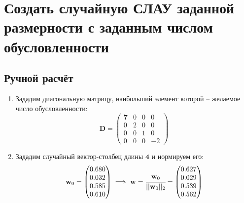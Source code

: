 


\setcounter{page}{2}
\tableofcontents
\listoffigures
\clearpage
\section{Создать случайную СЛАУ заданной размерности с заданным числом обусловленности}
\subsection{Ручной расчёт}
\begin{enumerate}
\item Зададим диагональную матрицу, наибольший элемент которой -- желаемое число обусловленности:
\begin{equation}
    \mathbf{D} =
    \begin{pmatrix}
        \mathbf{7} & 0 & 0 & 0 \\
        0 & 2 & 0 & 0 \\
        0 & 0 & 1 & 0 \\
        0 & 0 & 0 & -2
    \end{pmatrix}
\end{equation}

\item Зададим случайный вектор-столбец длины $\mathbf{4}$ и нормируем его:
\begin{equation}
    \mathbf{w}_0 =
    \begin{pmatrix}
        0.680 \\
        0.032 \\
        0.585 \\
        0.610
    \end{pmatrix} \implies
    \mathbf{w} = \cfrac{\mathbf{w}_0}{||\mathbf{w}_0||_2} =
    \begin{pmatrix}
        0.627 \\
        0.029 \\
        0.539 \\
        0.562
    \end{pmatrix}
\end{equation}


\end{enumerate}

